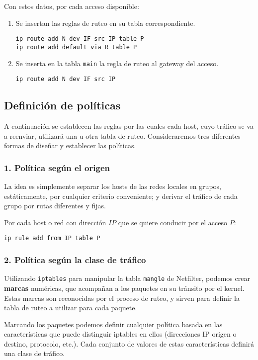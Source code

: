 Con estos datos, por cada acceso disponible:
\begin{enumerate}
	\item Se insertan las reglas de ruteo en su tabla correspondiente. 
\begin{lstlisting}
ip route add N dev IF src IP table P
ip route add default via R table P
\end{lstlisting}
	\item Se inserta en la tabla \texttt{main} la regla de ruteo al gateway del acceso.
	\begin{lstlisting}
ip route add N dev IF src IP
\end{lstlisting}
\end{enumerate} 

\subsection{Definición de políticas}
A continuación se establecen las reglas por las cuales cada host, cuyo tráfico se va a reenviar, utilizará una u otra tabla de ruteo. Consideraremos tres diferentes formas de diseñar y establecer las políticas. 

\subsubsection{1. Política según el origen}
La idea es simplemente separar los hosts de las redes locales en grupos, estáticamente, por cualquier criterio conveniente; y derivar el tráfico de cada grupo por rutas diferentes y fijas. 

Por cada host o red con dirección $IP$ que se quiere conducir por el acceso $P$:
\begin{lstlisting}
ip rule add from IP table P 
\end{lstlisting}

\subsubsection{2. Política según la clase de tráfico}

Utilizando \texttt{iptables} para manipular la tabla \texttt{mangle} de Netfilter, podemos crear \textbf{marcas} numéricas, que acompañan a los paquetes en su tránsito por el kernel. Estas marcas son reconocidas por el proceso de ruteo, y sirven para definir la tabla de ruteo a utilizar para cada paquete.

Marcando los paquetes podemos definir cualquier política basada en las características que puede distinguir iptables en ellos (direcciones IP origen o destino, protocolo, etc.). Cada conjunto de valores de estas características definirá una clase de tráfico.

